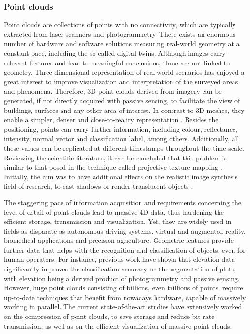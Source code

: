 \subsubsection{Point clouds}

Point clouds are collections of points with no connectivity, which are typically extracted from laser scanners and photogrammetry. There exists an enormous number of hardware and software solutions measuring real-world geometry at a constant pace, including the so-called digital twins. Although images carry relevant features and lead to meaningful conclusions, these are not linked to geometry. Three-dimensional representation of real-world scenarios has enjoyed a great interest to improve visualization and interpretation of the surveyed areas and phenomena. Therefore, 3D point clouds derived from imagery can be generated, if not directly acquired with passive sensing, to facilitate the view of buildings, surfaces and any other area of interest. In contrast to 3D meshes, they enable a simpler, denser and close-to-reality representation \cite{cao_3d_2019}. Besides the positioning, points can carry further information, including colour, reflectance, intensity, normal vector and classification label, among others. Additionally, all these values can be replicated at different timestamps throughout the time scale. Reviewing the scientific literature, it can be concluded that this problem is similar to that posed in the technique called projective texture mapping \cite{debevec_efficient_1998, heckbert_survey_1986}. Initially, the aim was to have additional effects on the realistic image synthesis field of research, to cast shadows or render translucent objects \cite{dachsbacher_translucent_2003}.

The staggering pace of information acquisition and requirements concerning the level of detail of point clouds lead to massive 4D data, thus hardening the efficient storage, transmission and visualization. Yet, they are widely used in fields as disparate as autonomous driving systems, virtual and augmented reality, biomedical applications and precision agriculture. Geometric features provide further data that helps with the recognition and classification of objects, even for human operators. For instance, previous work \cite{barros_multispectral_2022, kerkech_vine_2020, de_castro_3-d_2018} have shown that elevation data significantly improves the classification accuracy on the segmentation of plots, with elevation being a derived product of photogrammetry and passive sensing. However, huge point clouds consisting of billions, even trillions of points, require up-to-date techniques that benefit from nowadays hardware, capable of massively working in parallel. The current state-of-the-art studies have extensively worked on the compression of point clouds, to save storage and reduce bit rate transmission, as well as on the efficient visualization of massive point clouds. 

